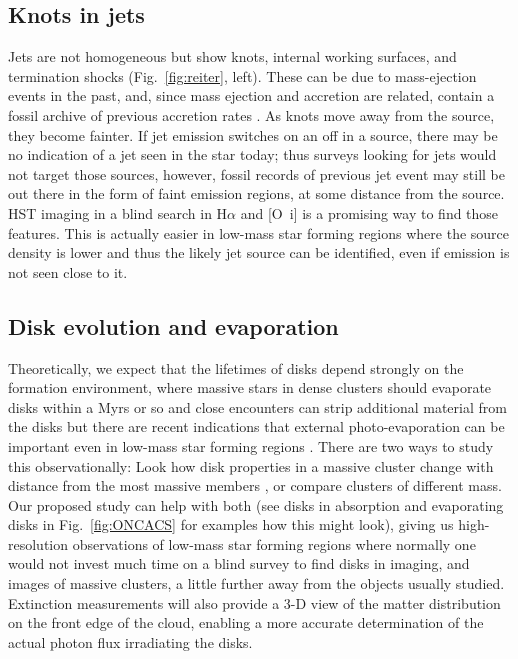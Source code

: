 \documentclass[12pt]{article}
\begin{document}
\subsection{Knots in jets}
Jets are not homogeneous but show knots, internal working surfaces, and termination shocks (Fig.~\ref{fig:reiter}, left). These can be due to mass-ejection events in the past, and, since mass ejection and accretion are related, contain a fossil archive of previous accretion rates \citep{2014A&A...563A..87E}. As knots move away from the source, they become fainter. If jet emission switches on an off in a source, there may be no indication of a jet seen in the star today; thus surveys looking for jets would not target those sources, however, fossil records of previous jet event may still be out there in the form of faint emission regions, at some distance from the source. HST imaging in a blind search in H$\alpha$ and [O~{\sc i}] is a promising way to find those features. This is actually easier in low-mass star forming regions where the source density is lower and thus the likely jet source can be identified, even if emission is not seen close to it.

\subsection{Disk evolution and evaporation}


Theoretically, we expect that the lifetimes of disks depend strongly on the formation environment, where massive stars in dense clusters should evaporate disks within a Myrs or so and close encounters can strip additional material from the disks \citep[e.g.][]{2004ApJ...611..360A,2019MNRAS.485.1489W,2019arXiv190211094N} but there are recent indications that external photo-evaporation can be important even in low-mass star forming regions \citep{2017MNRAS.468L.108H}.
There are two ways to study this observationally: Look how disk properties in a massive cluster change with distance from the most massive members \citep{2014ApJ...784...82M,2017AJ....153..240A,2018ApJ...860...77E}, or compare clusters of different mass. Our proposed study can help with both (see disks in absorption and evaporating disks in Fig.~\ref{fig:ONCACS} for examples how this might look), giving us high-resolution observations of low-mass star forming regions where normally one would not invest much time on a blind survey to find disks in imaging, and images of massive clusters, a little further away from the objects usually studied. Extinction measurements will also provide a 3-D view of the matter distribution on the front edge of the cloud, enabling a more accurate determination of the actual photon flux irradiating the disks. 
\end{document}
